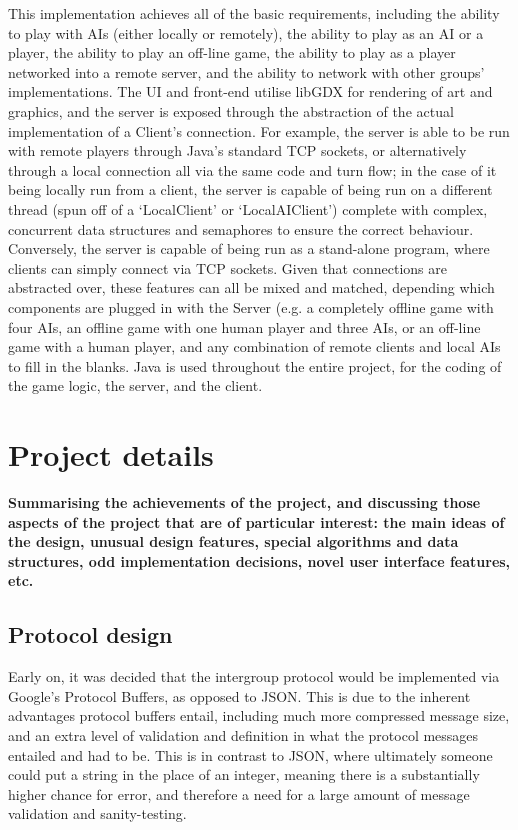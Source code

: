 \documentclass[a4paper,doc,draftfirst]{apa6}
\begin{document}
This implementation achieves all of the basic requirements, including the ability to play with AIs (either locally or remotely), the ability to play as an AI or a player, the ability to play an off-line game, the ability to play as a player networked into a remote server, and the ability to network with other groups’ implementations. The UI and front-end utilise libGDX for rendering of art and graphics, and the server is exposed through the abstraction of the actual implementation of a Client’s connection. For example, the server is able to be run with remote players through Java’s standard TCP sockets, or alternatively through a local connection all via the same code and turn flow; in the case of it being locally run from a client, the server is capable of being run on a different thread (spun off of a ‘LocalClient’ or ‘LocalAIClient’) complete with complex, concurrent data structures and semaphores to ensure the correct behaviour. Conversely, the server is capable of being run as a stand-alone program, where clients can simply connect via TCP sockets. Given that connections are abstracted over, these features can all be mixed and matched, depending which components are plugged in with the Server (e.g. a completely offline game with four AIs, an offline game with one human player and three AIs, or an off-line game with a human player, and any combination of remote clients and local AIs to fill in the blanks. Java is used throughout the entire project, for the coding of the game logic, the server, and the client.





\section{Project details}
\textbf{Summarising the achievements of the project, and discussing those aspects of the project that are of particular interest: the main ideas of the design, unusual design features, special algorithms and data structures, odd implementation decisions, novel user interface features, etc.}

\subsection{Protocol design}
Early on, it was decided that the intergroup protocol would be implemented via Google’s Protocol Buffers, as opposed to JSON. This is due to the inherent advantages protocol buffers entail, including much more compressed message size, and an extra level of validation and definition in what the protocol messages entailed and had to be. This is in contrast to JSON, where ultimately someone could put a string in the place of an integer, meaning there is a substantially higher chance for error, and therefore a need for a large amount of message validation and sanity-testing.
\end{document}
